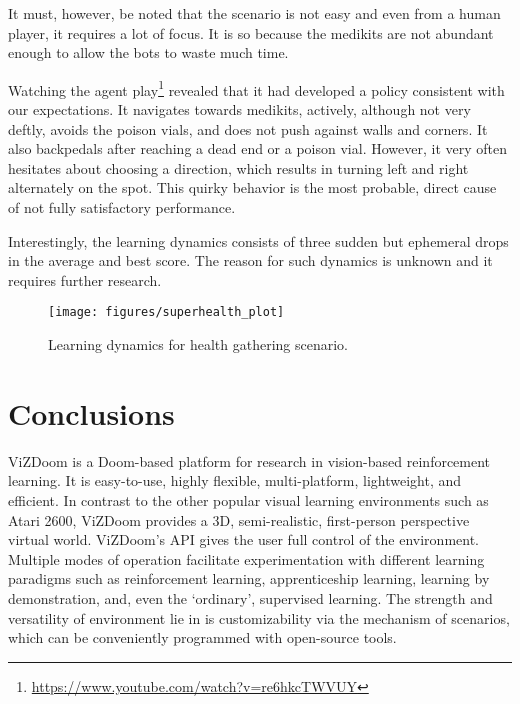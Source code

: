 \documentclass[english,american,conference, balance]{IEEEtran}
\begin{document}
It must, however, be noted that the scenario is not easy and even
from a human player, it requires a lot of focus. It is so because
the medikits are not abundant enough to allow the bots to waste much
time.

Watching the agent play\footnote{\href{https://www.youtube.com/watch?v=re6hkcTWVUY}{https://www.youtube.com/watch?v=re6hkcTWVUY}}
revealed that it had developed a policy consistent with our expectations.
It navigates towards medikits, actively, although not very deftly,
avoids the poison vials, and does not push against walls and corners.
It also backpedals after reaching a dead end or a poison vial. However,
it very often hesitates about choosing a direction, which results
in turning left and right alternately on the spot. This quirky behavior
is the most probable, direct cause of not fully satisfactory performance.

Interestingly, the learning dynamics consists of three sudden but
ephemeral drops in the average and best score. The reason for such
dynamics is unknown and it requires further research.

\begin{figure}
\begin{centering}
\texttt{[image: figures/superhealth\_plot]}
\par\end{centering}
\caption{\label{fig:superhealth-dynamics}Learning dynamics for health gathering
scenario.}

\end{figure}


\section{Conclusions\label{sec:Conclusions}}

ViZDoom is a Doom-based platform for research in vision-based reinforcement
learning. It is easy-to-use, highly flexible, multi-platform, lightweight,
and efficient. In contrast to the other popular visual learning environments
such as Atari 2600, ViZDoom provides a 3D, semi-realistic, first-person
perspective virtual world. ViZDoom's API gives the user full control
of the environment. Multiple modes of operation facilitate experimentation
with different learning paradigms such as reinforcement learning,
apprenticeship learning, learning by demonstration, and, even the
`ordinary', supervised learning. The strength and versatility of environment
lie in is customizability via the mechanism of scenarios, which can
be conveniently programmed with open-source tools.
\end{document}
